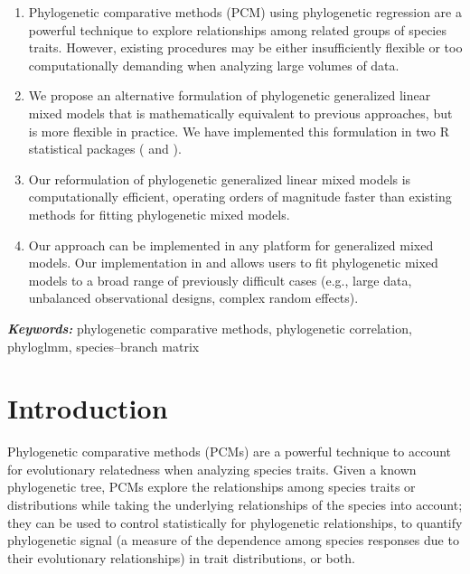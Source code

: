 \documentclass[12pt]{article}
\providecommand{\keywords}[1]{\textbf{\textit{Keywords:}} #1}
\begin{document}
\begin{enumerate}
\item{Phylogenetic comparative methods (PCM) using phylogenetic regression are a powerful technique to explore relationships among related groups of species traits. However, existing procedures may be either insufficiently flexible or too computationally demanding when analyzing large volumes of data.}
\item{We propose an alternative formulation of phylogenetic generalized linear mixed models that is mathematically equivalent to previous approaches, but is more flexible in practice. We have implemented this formulation in two R statistical packages ( and ).}
\item{Our reformulation of phylogenetic generalized linear mixed models is computationally efficient, operating orders of magnitude faster than existing methods for fitting phylogenetic mixed models.}
\item{Our approach can be implemented in any platform for generalized mixed models. Our implementation in  and  allows users to fit phylogenetic mixed models to a broad range of previously difficult cases (e.g., large data, unbalanced observational designs, complex random effects).}
\end{enumerate}



\keywords{phylogenetic comparative methods, phylogenetic correlation, phyloglmm, species--branch matrix}


\section*{Introduction}

Phylogenetic comparative methods (PCMs) are a powerful technique to account for evolutionary relatedness when analyzing species traits.
Given a known phylogenetic tree, PCMs explore the relationships among species traits or distributions while taking the underlying relationships of the species into account; they can be used to control statistically for phylogenetic relationships, to quantify phylogenetic signal (a measure of the dependence among species responses due to their evolutionary relationships) in trait distributions, or both. 
\end{document}

